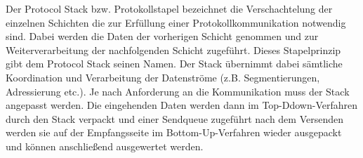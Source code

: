 Der Protocol Stack bzw. Protokollstapel bezeichnet die Verschachtelung der
einzelnen Schichten die zur Erf{\"u}llung einer Protokollkommunikation
notwendig sind. Dabei werden die Daten der vorherigen Schicht genommen und zur
Weiterverarbeitung der nachfolgenden Schicht zugef{\"u}hrt. Dieses Stapelprinzip
gibt dem Protocol Stack seinen Namen. Der Stack {\"u}bernimmt dabei
s{\"a}mtliche Koordination und Verarbeitung der Datenstr{\"o}me (z.B.
Segmentierungen, Adressierung etc.).
Je nach Anforderung an die Kommunikation muss der Stack angepasst werden. Die
eingehenden Daten werden dann im Top-Ddown-Verfahren durch den Stack verpackt
und einer Sendqueue zugef{\"u}hrt nach dem Versenden werden sie auf der
Empfangsseite im Bottom-Up-Verfahren wieder ausgepackt und k{\"o}nnen
anschließend ausgewertet werden.
